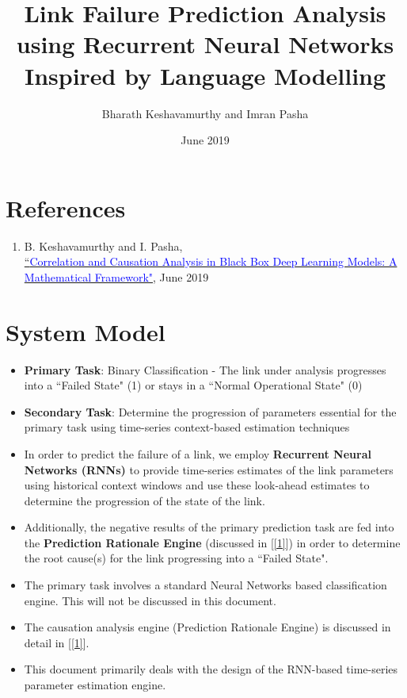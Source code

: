\documentclass{article}
\title{%
      Link Failure Prediction Analysis using Recurrent Neural Networks\\
      \large Inspired by Language Modelling}
\author{Bharath Keshavamurthy and Imran Pasha}
\affil{CISCO Systems, Inc.}
\date{June 2019}
\begin{document}
\maketitle
\section{References}
\begin{enumerate}
    \item B. Keshavamurthy and I. Pasha,\\ \href{https://1drv.ms/b/s!AuBe4WWXT0UOarnWAt3jLcnOvPs}{``\textcolor{blue}{Correlation and Causation Analysis in Black Box Deep Learning Models: A Mathematical Framework"}}, June 2019\label{1}
\end{enumerate}
\section{System Model}
\begin{itemize}
    \item \textbf{Primary Task}: Binary Classification - The link under analysis progresses into a ``Failed State" (1) or stays in a ``Normal Operational State" (0)
    \item \textbf{Secondary Task}: Determine the progression of parameters essential for the primary task using time-series context-based estimation techniques
    \item In order to predict the failure of a link, we employ \textbf{Recurrent Neural Networks (RNNs)} to provide time-series estimates of the link parameters using historical context windows and use these look-ahead estimates to determine the progression of the state of the link.
    \item Additionally, the negative results of the primary prediction task are fed into the \textbf{Prediction Rationale Engine} (discussed in [\ref{1}]) in order to determine the root cause(s) for the link progressing into a ``Failed State".
    \item The primary task involves a standard Neural Networks based classification engine. This will not be discussed in this document.
    \item The causation analysis engine (Prediction Rationale Engine) is discussed in detail in [\ref{1}].
    \item This document primarily deals with the design of the RNN-based time-series parameter estimation engine.
\end{itemize}
\end{document}
